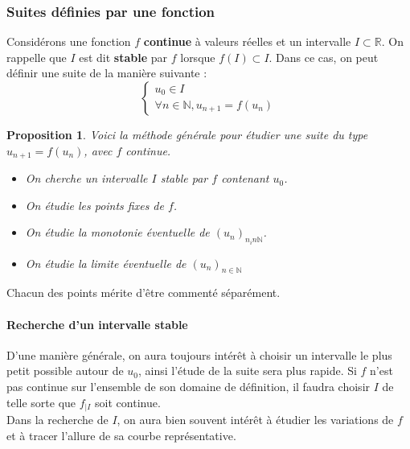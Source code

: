 \documentclass[french]{book}
\newcommand{\N}{\mathbb{N}}
\newcommand{\R}{\mathbb{R}}
\theoremstyle{plain}
\newtheorem{prop}{Proposition}[chapter]
\theoremstyle{definition}
\theoremstyle{remark}
\begin{document}
\subsubsection{Suites définies par une fonction}
Considérons une fonction $f$ \textbf{continue} à valeurs réelles et un intervalle $I\subset\R$. On rappelle que $I$ est dit \textbf{stable} par $f$ lorsque $f(I)\subset I$. Dans ce cas, on peut définir une suite de la manière suivante : $$\left \{\begin{array}{ll}u_0\in I\\ \forall n\in\N, u_{n+1}=f(u_n)\end{array}\right.$$
\begin{prop}
	Voici la méthode générale pour étudier une suite du type $u_{n+1}=f(u_n)$, avec $f$ continue. \begin{itemize}
		\item On cherche un intervalle $I$ stable par $f$ contenant $u_0$.
		\item On étudie les points fixes de $f$.
		\item On étudie la monotonie éventuelle de $(u_n)_{n_in\N}$.
		\item On étudie la limite éventuelle de $(u_n)_{n\in\N}$
	\end{itemize}
\end{prop}
Chacun des points mérite d'être commenté séparément. \\ 
\paragraph{Recherche d'un intervalle stable} D'une manière générale, on aura toujours intérêt à choisir un intervalle le plus petit possible autour de $u_0$, ainsi l'étude de la suite sera plus rapide. Si $f$ n'est pas continue sur l'ensemble de son domaine de définition, il faudra choisir $I$ de telle sorte que $f_{|I}$ soit continue. \\ Dans la recherche de $I$, on aura bien souvent intérêt à étudier les variations de $f$ et à tracer l'allure de sa courbe représentative. \\
\end{document}
